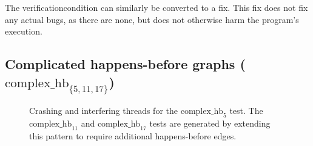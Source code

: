 The \gls{verificationcondition} can similarly be converted to a fix.
This fix does not fix any actual bugs, as there are none, but does not
otherwise harm the program's execution.

\subsection{Complicated happens-before graphs ($\textrm{complex\_hb}_{\{5,11,17\}}$)}

\begin{figure}
  \caption{Crashing and interfering threads for the
    $\textrm{complex\_hb}_5$ test.  The $\textrm{complex\_hb}_{11}$
    and $\textrm{complex\_hb}_{17}$ tests are generated by extending
    this pattern to require additional happens-before edges.}
  \label{fig:eval:complex_hb}
\end{figure}

